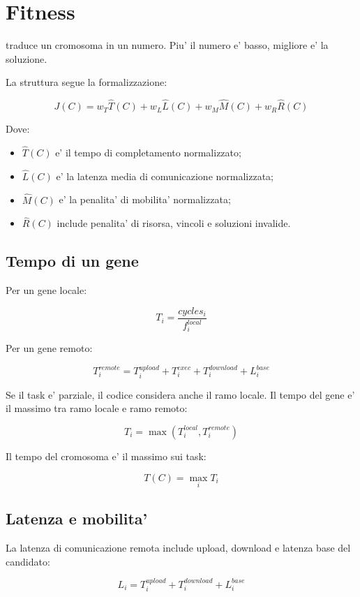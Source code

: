\documentclass[11pt,a4paper]{article}
\newcommand{\code}[1]{\texttt{\detokenize{#1}}}
\newcommand{\cls}[1]{\code{#1}}
\begin{document}
\section{Fitness}

\cls{FitnessEvaluator} traduce un cromosoma in un numero. Piu' il numero e'
basso, migliore e' la soluzione.

La struttura segue la formalizzazione:

\[
J(C) =
w_T \hat{T}(C) +
w_L \hat{L}(C) +
w_M \hat{M}(C) +
w_R \hat{R}(C)
\]

Dove:

\begin{itemize}[leftmargin=*,nosep]
    \item $\hat{T}(C)$ e' il tempo di completamento normalizzato;
    \item $\hat{L}(C)$ e' la latenza media di comunicazione normalizzata;
    \item $\hat{M}(C)$ e' la penalita' di mobilita' normalizzata;
    \item $\hat{R}(C)$ include penalita' di risorsa, vincoli e soluzioni invalide.
\end{itemize}

\subsection{Tempo di un gene}

Per un gene locale:

\[
T_i = \frac{cycles_i}{f_i^{local}}
\]

Per un gene remoto:

\[
T_i^{remote} =
T_i^{upload} + T_i^{exec} + T_i^{download} + L_i^{base}
\]

Se il task e' parziale, il codice considera anche il ramo locale. Il tempo del
gene e' il massimo tra ramo locale e ramo remoto:

\[
T_i = \max(T_i^{local}, T_i^{remote})
\]

Il tempo del cromosoma e' il massimo sui task:

\[
T(C)=\max_i T_i
\]

\subsection{Latenza e mobilita'}

La latenza di comunicazione remota include upload, download e latenza base del
candidato:

\[
L_i = T_i^{upload} + T_i^{download} + L_i^{base}
\]
\end{document}
